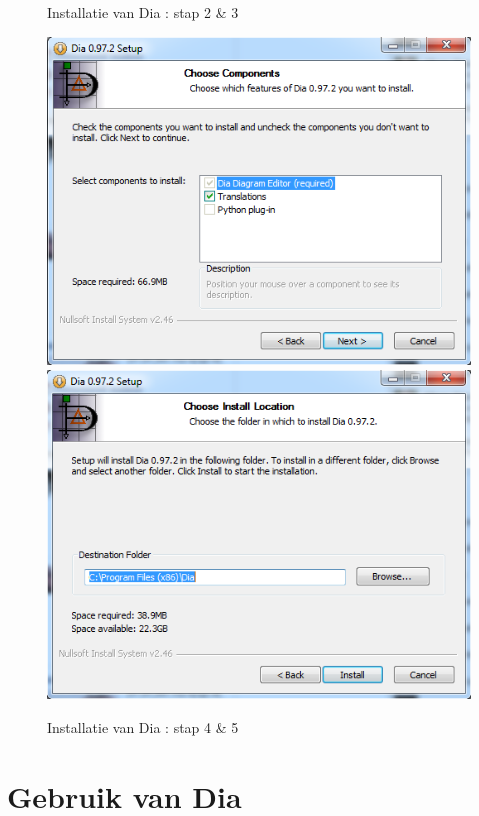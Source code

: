 \documentclass[12pt,a4paper]{report}
\begin{document}
\begin{flushleft}
\begin{figure}[H]
\vspace{-25pt}
\caption{Installatie van Dia : stap 2 \& 3} 
\end{figure}
\begin{figure}[H]
\includegraphics[scale=0.5]{images/install_05.png}
\includegraphics[scale=0.5]{images/install_06.png}
\centering 
\vspace{-25pt}
\caption{Installatie van Dia : stap 4 \& 5}  
\end{figure}
\pagebreak
\section{Gebruik van Dia}

\end{flushleft}
\end{document}
